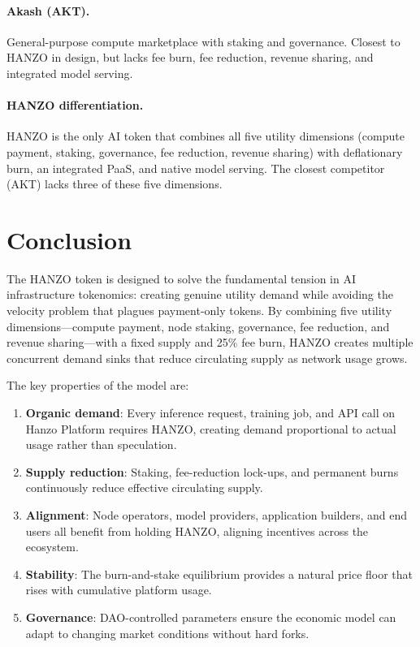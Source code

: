 \documentclass[11pt]{article}
\begin{document}
\paragraph{Akash (AKT).} General-purpose compute marketplace with staking and
governance. Closest to HANZO in design, but lacks fee burn, fee reduction,
revenue sharing, and integrated model serving.

\paragraph{HANZO differentiation.} HANZO is the only AI token that combines
all five utility dimensions (compute payment, staking, governance, fee
reduction, revenue sharing) with deflationary burn, an integrated PaaS, and
native model serving. The closest competitor (AKT) lacks three of these five
dimensions.

\section{Conclusion}
\label{sec:conclusion}

The HANZO token is designed to solve the fundamental tension in AI infrastructure
tokenomics: creating genuine utility demand while avoiding the velocity problem
that plagues payment-only tokens. By combining five utility dimensions---compute
payment, node staking, governance, fee reduction, and revenue sharing---with a
fixed supply and 25\% fee burn, HANZO creates multiple concurrent demand sinks
that reduce circulating supply as network usage grows.

The key properties of the model are:

\begin{enumerate}[leftmargin=1.4em]
    \item \textbf{Organic demand}: Every inference request, training job, and API
    call on Hanzo Platform requires HANZO, creating demand proportional to actual
    usage rather than speculation.
    \item \textbf{Supply reduction}: Staking, fee-reduction lock-ups, and
    permanent burns continuously reduce effective circulating supply.
    \item \textbf{Alignment}: Node operators, model providers, application
    builders, and end users all benefit from holding HANZO, aligning incentives
    across the ecosystem.
    \item \textbf{Stability}: The burn-and-stake equilibrium provides a natural
    price floor that rises with cumulative platform usage.
    \item \textbf{Governance}: DAO-controlled parameters ensure the economic model
    can adapt to changing market conditions without hard forks.
\end{enumerate}
\end{document}
